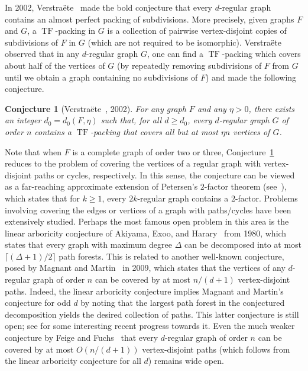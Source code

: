 \documentclass[10pt]{article}
\theoremstyle{plain}
\numberwithin{theorem}{section}
\newtheorem{conj}[theorem]{Conjecture}
\theoremstyle{definition}
\theoremstyle{remark}
\DeclareMathOperator{\TF}{TF}
\theoremstyle{plain}
\begin{document}
In 2002, Verstra\"ete~\cite{verstraete2002note} made the bold conjecture that every $d$-regular graph contains an almost perfect packing of subdivisions. More precisely, given graphs $F$ and $G$, a $\TF$-packing in $G$ is a collection of pairwise vertex-disjoint copies of subdivisions of $F$ in $G$ (which are not required to be isomorphic). Verstra\"ete~\cite{verstraete2002note} observed that in any $d$-regular graph $G$, one can find a $\TF$-packing which covers about half of the vertices of $G$ (by repeatedly removing subdivisions of $F$ from $G$ until we obtain a graph containing no subdivisions of $F$) and made the following conjecture.

\begin{conj}[Verstra\"ete~\cite{verstraete2002note}, 2002]
\label{conj:packingsubdivisons}
For any graph $F$ and any $\eta > 0$, there exists an integer $d_0 = d_0(F, \eta)$ such that, for all $d \ge d_0$, every $d$-regular graph $G$ of order $n$ contains a $\TF$-packing that covers all but at most $\eta n$ vertices of $G$.
\end{conj}


Note that when $F$ is a complete graph of order two or three, 
Conjecture~\ref{conj:packingsubdivisons} reduces to the problem of covering the vertices 
of a regular graph with vertex-disjoint paths or cycles, respectively. 
In this sense, the conjecture can be viewed as a far-reaching approximate extension 
of Petersen's $2$-factor theorem (see~\cite{lovasz1979combinatorial}), 
which states that for $k\ge 1$, every $2k$-regular graph contains a $2$-factor. Problems involving covering the edges or vertices of a graph with paths/cycles have been extensively studied. Perhaps the most famous open problem in this area is the linear arboricity conjecture of Akiyama, Exoo, and Harary~\cite{akiyama1980covering} from 1980, which states that every graph with maximum degree $\Delta$ can be decomposed into at most $\lceil(\Delta + 1)/2\rceil$ path forests. 
This is related to another well-known conjecture, posed by Magnant and Martin~\cite{magnant2009note} in 2009, which states that the vertices of any $d$-regular graph of order $n$ can be covered by at most $n/(d + 1)$ vertex-disjoint paths. Indeed, the linear arboricity conjecture implies Magnant and Martin's conjecture for odd $d$ by noting that the largest path forest in the conjectured decomposition yields the desired collection of paths.
This latter conjecture is still open; see \cite{feige2022path,gruslys2021cycle,montgomery2024approximate} for some interesting recent progress towards it.
Even the much weaker conjecture by Feige and Fuchs~\cite{feige2022path} that every $d$-regular graph of order $n$ can be covered by at most $O(n/(d + 1))$ vertex-disjoint paths (which follows from the linear arboricity conjecture for all $d$) remains wide open.
\end{document}

